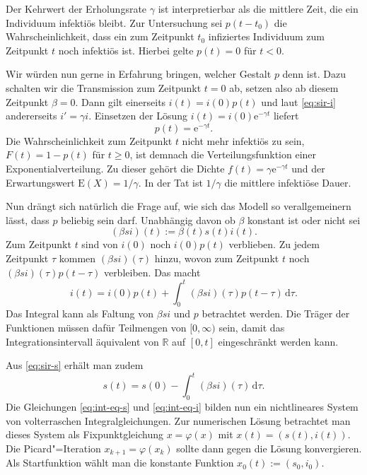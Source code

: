 \documentclass[a4paper,10pt,fleqn,twocolumn,twoside,dvipdfmx]{scrartcl}
\numberwithin{equation}{section}
\newcommand{\R}{\mathbb R}
\newcommand{\ee}{\mathrm e}
\begin{document}
Der Kehrwert der Erholungsrate $\gamma$ ist interpretierbar
als die mittlere Zeit, die ein Individuum infektiös bleibt. Zur
Untersuchung sei $p(t-t_0)$ die Wahrscheinlichkeit, dass ein zum Zeitpunkt
$t_0$ infiziertes Individuum zum Zeitpunkt $t$ noch infektiös ist.
Hierbei gelte $p(t)=0$ für $t<0$.

Wir würden nun gerne in Erfahrung bringen, welcher Gestalt $p$
denn ist. Dazu schalten wir die Transmission zum Zeitpunkt $t=0$
ab, setzen also ab diesem Zeitpunkt $\beta=0$. Dann gilt einerseits
$i(t)=i(0)p(t)$ und laut \eqref{eq:sir-i} andererseits
$i'=\gamma i$. Einsetzen der Lösung $i(t)=i(0)\ee^{-\gamma t}$
liefert%
\begin{equation}
p(t) = \ee^{-\gamma t}.
\end{equation}
Die Wahrscheinlichkeit zum Zeitpunkt $t$ nicht mehr infektiös zu sein,
$F(t)=1-p(t)$ für $t\ge 0$, ist demnach
die Verteilungsfunktion einer Exponentialverteilung.
Zu dieser gehört die Dichte
$f(t)=\gamma\ee^{-\gamma t}$ und der Erwartungswert
$\mathrm E(X) = 1/\gamma$. In der Tat ist $1/\gamma$ die mittlere
infektiöse Dauer.

Nun drängt sich natürlich die Frage auf, wie sich das Modell so
verallgemeinern lässt, dass $p$ beliebig sein darf.
Unabhängig davon ob $\beta$ konstant ist oder nicht sei
\[(\beta si)(t) := \beta(t)s(t)i(t).\]
Zum Zeitpunkt $t$ sind von $i(0)$ noch $i(0)p(t)$ verblieben.
Zu jedem Zeitpunkt $\tau$ kommen $(\beta si)(\tau)$ hinzu,
wovon zum Zeitpunkt $t$ noch $(\beta si)(\tau)p(t-\tau)$ verbleiben.
Das macht%
\begin{equation}\label{eq:int-eq-i}
i(t) = i(0)p(t) + \int_0^t (\beta si)(\tau)p(t-\tau)\,\mathrm d\tau.
\end{equation}
Das Integral kann als Faltung von $\beta si$ und $p$ betrachtet
werden. Die Träger der Funktionen müssen dafür Teilmengen von
$[0,\infty)$ sein, damit das Integrationsintervall äquivalent
von $\R$ auf $[0,t]$ eingeschränkt werden kann.

Aus \eqref{eq:sir-s} erhält man zudem
\begin{equation}\label{eq:int-eq-s}
s(t) = s(0) - \int_0^t (\beta si)(\tau)\,\mathrm d\tau.
\end{equation}
Die Gleichungen \eqref{eq:int-eq-s} und \eqref{eq:int-eq-i}
bilden nun ein nichtlineares System von volterraschen
Integralgleichungen. Zur numerischen
Lösung betrachtet man dieses System als Fixpunktgleichung
$x=\varphi(x)$ mit $x(t)=(s(t),i(t))$. Die Picard"=Iteration
$x_{k+1} = \varphi(x_k)$ sollte dann gegen die Lösung konvergieren.
Als Startfunktion wählt man die konstante Funktion
$x_0(t) := (s_0,i_0)$.
\end{document}
